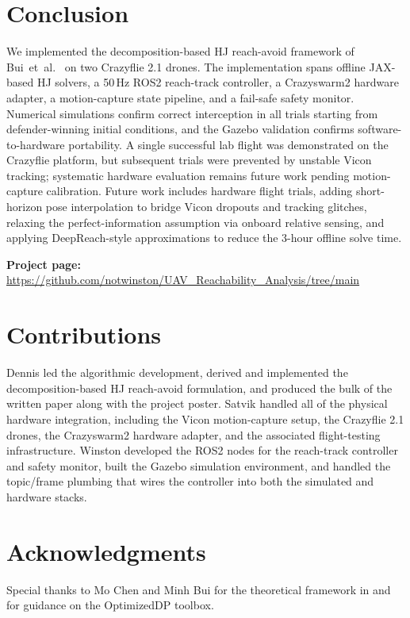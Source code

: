 \documentclass[conference]{IEEEtran}
\begin{document}
\section{Conclusion}
\label{sec:conclusion}

We implemented the decomposition-based HJ reach-avoid framework of Bui~et~al.~\cite{bui2025reach} on two Crazyflie 2.1 drones. The implementation spans offline JAX-based HJ solvers, a 50\,Hz ROS2 reach-track controller, a Crazyswarm2 hardware adapter, a motion-capture state pipeline, and a fail-safe safety monitor. Numerical simulations confirm correct interception in all trials starting from defender-winning initial conditions, and the Gazebo validation confirms software-to-hardware portability. A single successful lab flight was demonstrated on the Crazyflie platform, but subsequent trials were prevented by unstable Vicon tracking; systematic hardware evaluation remains future work pending motion-capture calibration. Future work includes hardware flight trials, adding short-horizon pose interpolation to bridge Vicon dropouts and tracking glitches, relaxing the perfect-information assumption via onboard relative sensing, and applying DeepReach-style approximations to reduce the 3-hour offline solve time.

\textbf{Project page:} \url{https://github.com/notwinston/UAV_Reachability_Analysis/tree/main}

\section*{Contributions}
Dennis led the algorithmic development, derived and implemented the decomposition-based HJ reach-avoid formulation, and produced the bulk of the written paper along with the project poster. Satvik handled all of the physical hardware integration, including the Vicon motion-capture setup, the Crazyflie 2.1 drones, the Crazyswarm2 hardware adapter, and the associated flight-testing infrastructure. Winston developed the ROS2 nodes for the reach-track controller and safety monitor, built the Gazebo simulation environment, and handled the topic/frame plumbing that wires the controller into both the simulated and hardware stacks.

\section*{Acknowledgments}
Special thanks to Mo Chen and Minh Bui for the theoretical framework in \cite{bui2025reach} and for guidance on the OptimizedDP toolbox.
\end{document}
